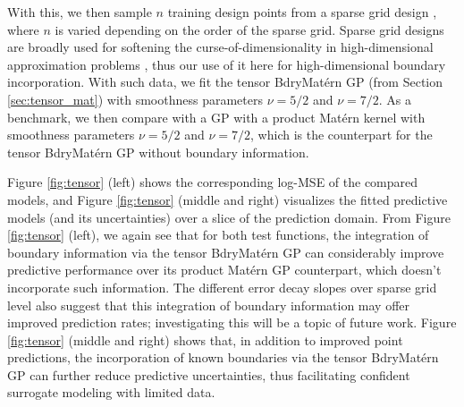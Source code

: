 \documentclass[aos,preprint]{imsart}
\theoremstyle{plain}
\theoremstyle{remark}
\begin{document}
With this, we then sample $n$ training design points from a sparse grid design \cite{Bungartz04}, where $n$ is varied depending on the order of the sparse grid. Sparse grid designs are broadly used for softening the curse-of-dimensionality in high-dimensional approximation problems \cite{Plumlee14}, thus our use of it here for high-dimensional boundary incorporation. With such data, we fit the tensor BdryMat\'ern GP (from Section \ref{sec:tensor_mat}) with smoothness parameters \(\nu=5/2\) and \(\nu=7/2\). As a benchmark, we then compare with a GP with a product Mat\'ern kernel with smoothness parameters $\nu = 5/2$ and $\nu=7/2$, which is the counterpart for the tensor BdryMat\'ern GP without boundary information. 



Figure \ref{fig:tensor} (left) shows the corresponding log-MSE of the compared models, and Figure \ref{fig:tensor} (middle and right) visualizes the fitted predictive models (and its uncertainties) over a slice of the prediction domain. From Figure \ref{fig:tensor} (left), we again see that for both test functions, the integration of boundary information via the tensor BdryMat\'ern GP can considerably improve predictive performance over its product Mat\'ern GP counterpart, which doesn't incorporate such information. The different error decay slopes over sparse grid level also suggest that this integration of boundary information may offer improved prediction rates; investigating this will be a topic of future work. Figure \ref{fig:tensor} (middle and right) shows that, in addition to improved point predictions, the incorporation of known boundaries  via the tensor BdryMat\'ern GP can further reduce predictive uncertainties, thus facilitating confident surrogate modeling with limited data.

\end{document}
